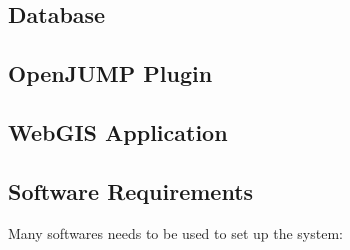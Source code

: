 \subsection{Database}\label{subsec:database}

\subsection{OpenJUMP Plugin}\label{subsec:openjump-plugin}

\subsection{WebGIS Application}\label{subsec:webgis-application}

\subsection{Software Requirements}\label{subsec:software-requirements}
Many softwares needs to be used to set up the system:
